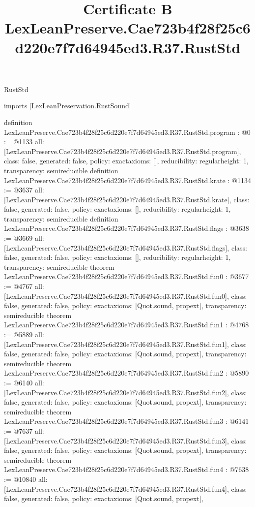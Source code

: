 \begin{lexlean}{RustStd}
\title{Certificate B LexLeanPreserve.Cae723b4f28f25c6d220e7f7d64945ed3.R37.RustStd}
\begin{coremodule}
imports [LexLeanPreservation.RustSound]

definition LexLeanPreserve.Cae723b4f28f25c6d220e7f7d64945ed3.R37.RustStd.program : @0 := @1133 {
  all: [LexLeanPreserve.Cae723b4f28f25c6d220e7f7d64945ed3.R37.RustStd.program],
  class: false,
  generated: false,
  policy: exact{axioms: []},
  reducibility: regular{height: 1},
  transparency: semireducible
}
definition LexLeanPreserve.Cae723b4f28f25c6d220e7f7d64945ed3.R37.RustStd.krate : @1134 := @3637 {
  all: [LexLeanPreserve.Cae723b4f28f25c6d220e7f7d64945ed3.R37.RustStd.krate],
  class: false,
  generated: false,
  policy: exact{axioms: []},
  reducibility: regular{height: 1},
  transparency: semireducible
}
definition LexLeanPreserve.Cae723b4f28f25c6d220e7f7d64945ed3.R37.RustStd.flags : @3638 := @3669 {
  all: [LexLeanPreserve.Cae723b4f28f25c6d220e7f7d64945ed3.R37.RustStd.flags],
  class: false,
  generated: false,
  policy: exact{axioms: []},
  reducibility: regular{height: 1},
  transparency: semireducible
}
theorem LexLeanPreserve.Cae723b4f28f25c6d220e7f7d64945ed3.R37.RustStd.fun0 : @3677 := @4767 {
  all: [LexLeanPreserve.Cae723b4f28f25c6d220e7f7d64945ed3.R37.RustStd.fun0],
  class: false,
  generated: false,
  policy: exact{axioms: [Quot.sound, propext]},
  transparency: semireducible
}
theorem LexLeanPreserve.Cae723b4f28f25c6d220e7f7d64945ed3.R37.RustStd.fun1 : @4768 := @5889 {
  all: [LexLeanPreserve.Cae723b4f28f25c6d220e7f7d64945ed3.R37.RustStd.fun1],
  class: false,
  generated: false,
  policy: exact{axioms: [Quot.sound, propext]},
  transparency: semireducible
}
theorem LexLeanPreserve.Cae723b4f28f25c6d220e7f7d64945ed3.R37.RustStd.fun2 : @5890 := @6140 {
  all: [LexLeanPreserve.Cae723b4f28f25c6d220e7f7d64945ed3.R37.RustStd.fun2],
  class: false,
  generated: false,
  policy: exact{axioms: [Quot.sound, propext]},
  transparency: semireducible
}
theorem LexLeanPreserve.Cae723b4f28f25c6d220e7f7d64945ed3.R37.RustStd.fun3 : @6141 := @7637 {
  all: [LexLeanPreserve.Cae723b4f28f25c6d220e7f7d64945ed3.R37.RustStd.fun3],
  class: false,
  generated: false,
  policy: exact{axioms: [Quot.sound, propext]},
  transparency: semireducible
}
theorem LexLeanPreserve.Cae723b4f28f25c6d220e7f7d64945ed3.R37.RustStd.fun4 : @7638 := @10840 {
  all: [LexLeanPreserve.Cae723b4f28f25c6d220e7f7d64945ed3.R37.RustStd.fun4],
  class: false,
  generated: false,
  policy: exact{axioms: [Quot.sound, propext]},
}
\end{coremodule}
\end{lexlean}

